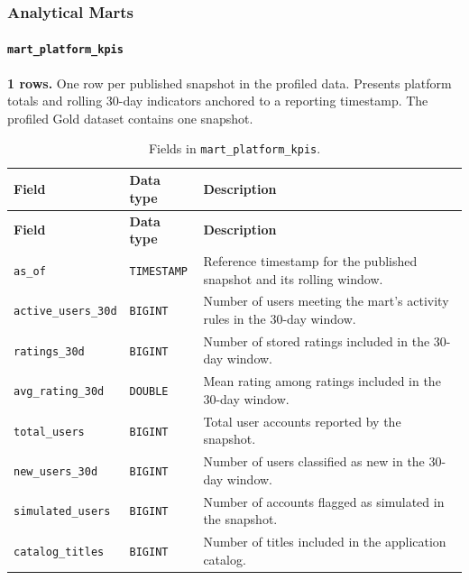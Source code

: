 \documentclass[a4paper,12pt]{article}
\newcommand{\dbsep}{\_\allowbreak}
\begin{document}
\subsubsection{Analytical Marts}

\paragraph{\texttt{mart\dbsep platform\dbsep kpis}}
\textbf{1 rows.} One row per published snapshot in the profiled data.
Presents platform totals and rolling 30-day indicators anchored to a reporting timestamp. The profiled Gold dataset contains one snapshot.

\begingroup
\small
\setlength{\tabcolsep}{4pt}
\renewcommand{\arraystretch}{1.1}
\begin{longtable}{@{}>{\raggedright\arraybackslash}p{}
                    >{\raggedright\arraybackslash}p{}
                    >{\raggedright\arraybackslash}p{}@{}}
\caption{Fields in \texttt{mart\dbsep platform\dbsep kpis}.}\\
\toprule
\textbf{Field} & \textbf{Data type} & \textbf{Description}\\
\midrule
\endfirsthead
\toprule
\textbf{Field} & \textbf{Data type} & \textbf{Description}\\
\midrule
\endhead
\bottomrule
\endfoot
\texttt{as\dbsep of} & \texttt{TIMESTAMP} & Reference timestamp for the published snapshot and its rolling window.\\
\texttt{active\dbsep users\dbsep 30d} & \texttt{BIGINT} & Number of users meeting the mart's activity rules in the 30-day window.\\
\texttt{ratings\dbsep 30d} & \texttt{BIGINT} & Number of stored ratings included in the 30-day window.\\
\texttt{avg\dbsep rating\dbsep 30d} & \texttt{DOUBLE} & Mean rating among ratings included in the 30-day window.\\
\texttt{total\dbsep users} & \texttt{BIGINT} & Total user accounts reported by the snapshot.\\
\texttt{new\dbsep users\dbsep 30d} & \texttt{BIGINT} & Number of users classified as new in the 30-day window.\\
\texttt{simulated\dbsep users} & \texttt{BIGINT} & Number of accounts flagged as simulated in the snapshot.\\
\texttt{catalog\dbsep titles} & \texttt{BIGINT} & Number of titles included in the application catalog.\\

\end{longtable}
\end{document}
